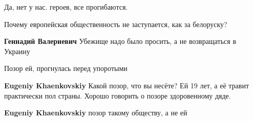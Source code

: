 \begin{itemize}
Да, нет у нас. героев, все прогибаются.

 
Почему европейская общественность не заступается, как за белоруску?

\begin{itemize}
 
\textbf{Геннадий Валериевич} Убежище надо было просить, а не возвращаться в Украину🧐
\end{itemize}

 
Позор ей, прогнулась перед упоротыми

\begin{itemize}
 
\textbf{Eugeniy Khaenkovskiy} Какой позор, что вы несёте? Ей 19 лет, а её травит практически пол страны. Хорошо говорить о позоре здоровенному дяде.

 
\textbf{Eugeniy Khaenkovskiy} позор такому обществу, а не ей
\end{itemize}

 

\end{itemize}
